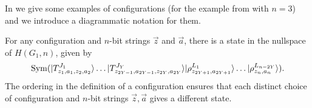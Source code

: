\documentclass[../thesis-main/thesis-main]{subfiles}
\begin{document}
%
%

In  we give some examples of configurations (for the example from  with $n=3$) and we introduce a diagrammatic notation for them.

For any configuration and $n$-bit strings $\vec{z}$ and $\vec{a}$, there is a state in the nullspace of $H(G_{1},n)$, given by
\begin{equation}
\operatorname{Sym}(|T_{z_{1},a_{1},z_{2},a_{2}}^{J_{1}}\rangle\ldots|T_{z_{2Y-1},a_{2Y-1},z_{2Y},a_{2Y}}^{J_{Y}}\rangle|\rho_{z_{2Y+1},a_{2Y+1}}^{L_{1}}\rangle\ldots|\rho_{z_{n},a_{n}}^{L_{n-2Y}}\rangle).\label{eq:config_data_state}
\end{equation}
The ordering in the definition of a configuration ensures that each distinct choice of configuration and $n$-bit strings $\vec{z},\vec{a}$ gives a different state.
\end{document}
